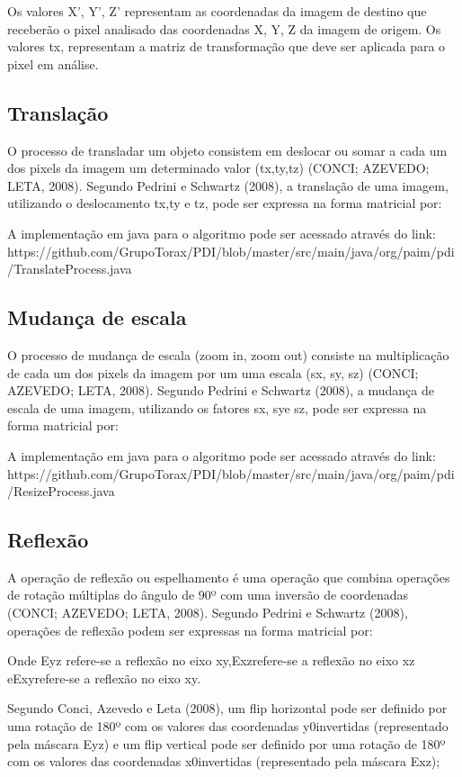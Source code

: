 \documentclass[
	12pt,				%
	oneside,			%
	a4paper,			%
	english,			%
	french,				%
	spanish,			%
	brazil,				%
	]{abntex2}
\begin{document}
Os valores X’, Y’, Z’ representam as coordenadas da imagem de destino que receberão o pixel analisado das coordenadas X, Y, Z da imagem de origem. Os valores tx, representam a matriz de transformação que deve ser aplicada para o pixel em análise.

\subsection{Translação}

O processo de transladar um objeto consistem em deslocar ou somar a cada um dos pixels da imagem um determinado valor (tx,ty,tz) (CONCI; AZEVEDO; LETA, 2008). Segundo Pedrini e Schwartz (2008), a translação de uma imagem, utilizando o deslocamento tx,ty e tz, pode ser expressa na forma matricial por:

A implementação em java para o algoritmo pode ser acessado através do link:
https://github.com/GrupoTorax/PDI/blob/master/src/main/java/org/paim/pdi/TranslateProcess.java 

\subsection{Mudança de escala}

O processo de mudança de escala (zoom in, zoom out) consiste na multiplicação de cada um dos pixels da imagem por um uma escala (sx, sy, sz)  (CONCI; AZEVEDO; LETA, 2008). Segundo Pedrini e Schwartz (2008), a mudança de escala de uma imagem, utilizando os fatores sx, sye sz, pode ser expressa na forma matricial por:

A implementação em java para o algoritmo pode ser acessado através do link:
https://github.com/GrupoTorax/PDI/blob/master/src/main/java/org/paim/pdi/ResizeProcess.java 

\subsection{Reflexão}

A operação de reflexão ou espelhamento é uma operação que combina operações de rotação múltiplas do ângulo de 90º com uma inversão de coordenadas (CONCI; AZEVEDO; LETA, 2008). Segundo Pedrini e Schwartz (2008), operações de reflexão podem ser expressas na forma matricial por:


Onde Eyz refere-se a reflexão no eixo xy,Exzrefere-se a reflexão no eixo xz eExyrefere-se a reflexão no eixo xy.

Segundo Conci, Azevedo e Leta (2008), um flip horizontal pode ser definido por uma rotação de 180º com os valores das coordenadas y0invertidas (representado pela máscara Eyz) e um flip vertical pode ser definido por uma rotação de 180º com os valores das coordenadas x0invertidas (representado pela máscara Exz);
\end{document}
